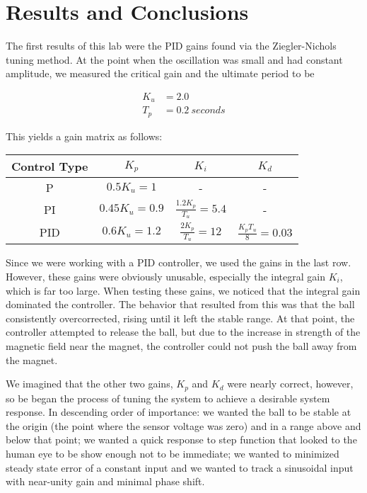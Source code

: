 \documentclass{article}
\begin{document}
\section{Results and Conclusions}
The first results of this lab were the PID gains found via the Ziegler-Nichols tuning method.  At the point when the oscillation was small and had constant amplitude, we measured the critical gain and the ultimate period to be
\begin{center}
\begin{align*}
K_u &= 2.0 \\
T_p &= 0.2~seconds
\end{align*}
\end{center}
This yields a gain matrix as follows:
\begin{center}
\begin{tabular}{|c|c|c|c|} \hline
Control Type & $K_p$ & $K_i$ & $K_d$ \\ \hline
P & $0.5K_u = 1$ & - & - \\
PI & $0.45K_u = 0.9$ & $\frac{1.2K_p}{T_u} = 5.4$ & - \\
PID & $0.6K_u = 1.2$ & $\frac{2K_p}{T_u} = 12$ & $\frac{K_pT_u}{8} = 0.03$ \\ \hline
\end{tabular}
\end{center}

Since we were working with a PID controller, we used the gains in the last row.  However, these gains were obviously unusable, especially the integral gain $K_i$, which is far too large.  When testing these gains, we noticed that the integral gain dominated the controller.  The behavior that resulted from this was that the ball consistently overcorrected, rising until it left the stable range.  At that point, the controller attempted to release the ball, but due to the increase in strength of the magnetic field near the magnet, the controller could not push the ball away from the magnet.

We imagined that the other two gains, $K_p$ and $K_d$ were nearly correct, however, so be began the process of tuning the system to achieve a desirable system response.  In descending order of importance: we wanted the ball to be stable at the origin (the point where the sensor voltage was zero) and in a range above and below that point; we wanted a quick response to step function that looked to the human eye to be show enough not to be immediate; we wanted to minimized steady state error of a constant input and we wanted to track a sinusoidal input with near-unity gain and minimal phase shift.
\end{document}
